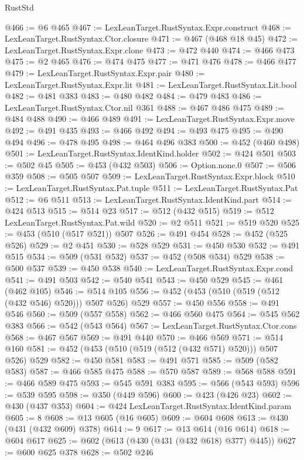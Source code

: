 \begin{lexlean}{RustStd}
\begin{coremodule}
{\begin{coremodule}
{{{{{{{{{{{{@466 := @6 @465
@467 := LexLeanTarget.RustSyntax.Expr.construct
@468 := LexLeanTarget.RustSyntax.Ctor.closure
@471 := @467 (@468 @18 @45)
@472 := LexLeanTarget.RustSyntax.Expr.clone
@473 := @472 @440
@474 := @466 @473
@475 := @2 @465
@476 := @474 @475
@477 := @471 @476
@478 := @466 @477
@479 := LexLeanTarget.RustSyntax.Expr.pair
@480 := LexLeanTarget.RustSyntax.Expr.lit
@481 := LexLeanTarget.RustSyntax.Lit.bool
@482 := @481 @383
@483 := @480 @482
@484 := @479 @483
@486 := LexLeanTarget.RustSyntax.Ctor.nil @361
@488 := @467 @486 @475
@489 := @484 @488
@490 := @466 @489
@491 := LexLeanTarget.RustSyntax.Expr.move
@492 := @491 @435
@493 := @466 @492
@494 := @493 @475
@495 := @490 @494
@496 := @478 @495
@498 := @464 @496 @383
@500 := @452 (@460 @498)
@501 := LexLeanTarget.RustSyntax.IdentKind.holder
@502 := @424 @501
@503 := @502 @45
@505 := @453 (@432 @503)
@506 := Option.none.{0}
@507 := @506 @359
@508 := @505 @507
@509 := LexLeanTarget.RustSyntax.Expr.block
@510 := LexLeanTarget.RustSyntax.Pat.tuple
@511 := LexLeanTarget.RustSyntax.Pat
@512 := @6 @511
@513 := LexLeanTarget.RustSyntax.IdentKind.part
@514 := @424 @513
@515 := @514 @23
@517 := @512 (@432 @515)
@519 := @512 LexLeanTarget.RustSyntax.Pat.wild
@520 := @2 @511
@521 := @519 @520
@525 := @453 (@510 (@517 @521)) @507
@526 := @491 @454
@528 := @452 (@525 @526)
@529 := @2 @451
@530 := @528 @529
@531 := @450 @530
@532 := @491 @515
@534 := @509 (@531 @532)
@537 := @452 (@508 @534) @529
@538 := @500 @537
@539 := @450 @538
@540 := LexLeanTarget.RustSyntax.Expr.cond
@541 := @491 @503
@542 := @540 @541
@543 := @450 @529
@545 := @461 (@462 @105)
@546 := @514 @105
@556 := @452 (@453 (@510 (@519 (@512 (@432 @546) @520))) @507 @526) @529
@557 := @450 @556
@558 := @491 @546
@560 := @509 (@557 @558)
@562 := @466 @560 @475
@564 := @545 @562 @383
@566 := @542 (@543 @564)
@567 := LexLeanTarget.RustSyntax.Ctor.cons
@568 := @467 @567
@569 := @491 @440
@570 := @466 @569
@571 := @514 @160
@581 := @452 (@453 (@510 (@519 (@512 (@432 @571) @520))) @507 @526) @529
@582 := @450 @581
@583 := @491 @571
@585 := @509 (@582 @583)
@587 := @466 @585 @475
@588 := @570 @587
@589 := @568 @588
@591 := @466 @589 @475
@593 := @545 @591 @383
@595 := @566 (@543 @593)
@596 := @539 @595
@598 := @350 (@449 @596)
@600 := @423 (@426 @23)
@602 := @430 (@437 @353)
@604 := @424 LexLeanTarget.RustSyntax.IdentKind.param
@605 := 8
@608 := @13 @605 (@16 @605)
@609 := @604 @608
@613 := @430 (@431 (@432 @609) @378)
@614 := 9
@617 := @13 @614 (@16 @614)
@618 := @604 @617
@625 := @602 (@613 (@430 (@431 (@432 @618) @377) @445))
@627 := @600 @625 @378
@628 := @502 @246
}}}}}}}}}}}}
\end{coremodule}}
\end{coremodule}
\end{lexlean}
